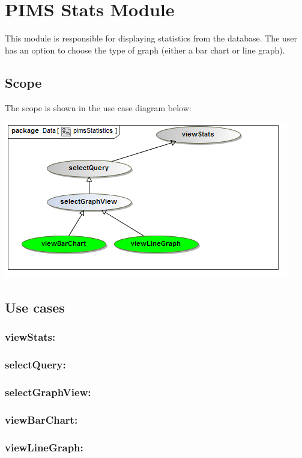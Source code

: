 \section{PIMS Stats Module}
This module is responsible for displaying statistics from the database. The user has an option to choose the type of graph (either a bar chart or line graph). \par 

\subsection{Scope}
The scope is shown in the use case diagram below: \par
\includegraphics[width=0.75\linewidth]{./Graphics/pimsStats/pimsStatistics}

\subsection{Use cases}
	\subsubsection{viewStats:} 
	\subsubsection{selectQuery:}
	\subsubsection{selectGraphView:}
	\subsubsection{viewBarChart:}
	\subsubsection{viewLineGraph:}  
